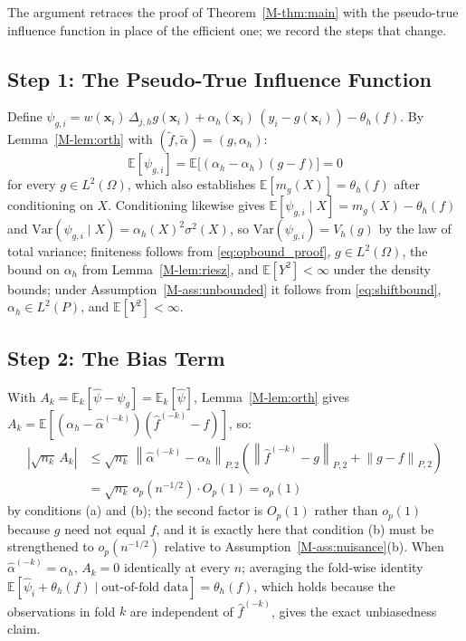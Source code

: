 \documentclass[12pt,a4paper]{article}
\numberwithin{equation}{section}
\theoremstyle{plain}
\theoremstyle{definition}
\newcommand{\norm}[1]{\left\| #1 \right\|}
\newcommand{\E}{\mathbb{E}}
\newcommand{\abs}[1]{\left| #1 \right|}
\newcommand{\Dh}{\Delta_{j,h}}
\newcommand{\Ptwo}[1]{\norm{#1}_{P,2}}
\begin{document}
	The argument retraces the proof of Theorem~\ref{M-thm:main} with the pseudo-true
	influence function in place of the efficient one; we record the steps that change.
	
	\subsection{Step 1: The Pseudo-True Influence Function}
	
	Define $\psi_{g,i} = w(\mathbf{x}_i)\, \Dh g(\mathbf{x}_i)
	+ \alpha_h(\mathbf{x}_i)\,(y_i - g(\mathbf{x}_i)) - \theta_h(f)$. By
	Lemma~\ref{M-lem:orth} with $(\tilde{f}, \tilde{\alpha}) = (g, \alpha_h)$:
	\begin{equation}
		\E[\psi_{g,i}]
		= \E\bigl[(\alpha_h - \alpha_h)(g - f)\bigr] = 0
	\end{equation}
	for every $g \in L^2(\Omega)$, which also establishes
	$\E[m_g(X)] = \theta_h(f)$ after conditioning on $X$. Conditioning likewise gives
	$\E[\psi_{g,i} \mid X] = m_g(X) - \theta_h(f)$ and
	$\mathrm{Var}(\psi_{g,i} \mid X) = \alpha_h(X)^2 \sigma^2(X)$, so
	$\mathrm{Var}(\psi_{g,i}) = V_h(g)$ by the law of total variance; finiteness
	follows from \eqref{eq:opbound_proof}, $g \in L^2(\Omega)$, the bound on
	$\alpha_h$ from Lemma~\ref{M-lem:riesz}, and $\E[Y^2] < \infty$ under the density
	bounds; under Assumption~\ref{M-ass:unbounded} it follows from
	\eqref{eq:shiftbound}, $\alpha_h \in L^2(P)$, and $\E[Y^2] < \infty$.
	
	\subsection{Step 2: The Bias Term}
	
	With $A_k = \E_k[\hat{\psi} - \psi_g] = \E_k[\hat{\psi}]$, Lemma~\ref{M-lem:orth}
	gives $A_k = \E[(\alpha_h - \hat{\alpha}^{(-k)})(\hat{f}^{(-k)} - f)]$, so:
	\begin{equation}
		\begin{split}
			\abs{\sqrt{n_k}\, A_k}
			&\leq \sqrt{n_k}\, \Ptwo{\hat{\alpha}^{(-k)} - \alpha_h}
			\left( \Ptwo{\hat{f}^{(-k)} - g} + \Ptwo{g - f} \right) \\
			&= \sqrt{n_k}\, o_p(n^{-1/2}) \cdot O_p(1) = o_p(1)
		\end{split}
	\end{equation}
	by conditions (a) and (b); the second factor is $O_p(1)$ rather than $o_p(1)$
	because $g$ need not equal $f$, and it is exactly here that condition (b) must be
	strengthened to $o_p(n^{-1/2})$ relative to Assumption~\ref{M-ass:nuisance}(b).
	When $\hat{\alpha}^{(-k)} = \alpha_h$, $A_k = 0$ identically at every $n$;
	averaging the fold-wise identity
	$\E[\hat{\psi}_i + \theta_h(f) \mid \text{out-of-fold data}] = \theta_h(f)$,
	which holds because the observations in fold $k$ are independent of
	$\hat{f}^{(-k)}$, gives the exact unbiasedness claim.
	
\end{document}
